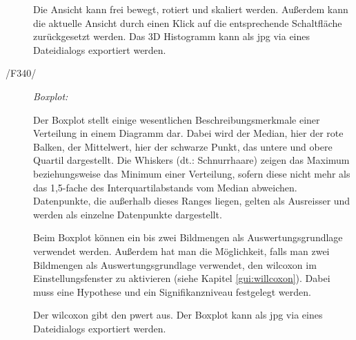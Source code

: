 \begin{description}
			Die Ansicht kann frei bewegt, rotiert und skaliert werden. Außerdem kann die aktuelle Ansicht durch einen Klick auf die entsprechende Schaltfläche zurückgesetzt werden. Das 3D Histogramm kann als \gls{jpg} via eines Dateidialogs exportiert werden.
\newpage
		\item[/F340/] \textit{Boxplot:}\par 
			\begin{figure}[H]
				\centering
			\end{figure}
			Der Boxplot stellt einige wesentlichen Beschreibungsmerkmale einer Verteilung in einem Diagramm dar. Dabei wird der Median, hier der rote Balken, der Mittelwert, hier der schwarze Punkt, das untere und obere Quartil dargestellt. Die Whiskers (dt.: Schnurrhaare) zeigen das Maximum beziehungsweise das Minimum einer Verteilung, sofern diese nicht mehr als das 1,5-fache des Interquartilabstands vom Median abweichen. Datenpunkte, die außerhalb dieses Ranges liegen, gelten als Ausreisser und werden als einzelne Datenpunkte dargestellt.
			\par
			Beim Boxplot können ein bis zwei Bildmengen als Auswertungsgrundlage verwendet werden. Außerdem hat man die Möglichkeit, falls man zwei Bildmengen als Auswertungsgrundlage verwendet, den \gls{wilcoxon} im Einstellungsfenster zu aktivieren (siehe Kapitel \ref{gui:willcoxon}). Dabei muss eine Hypothese und ein Signifikanzniveau festgelegt werden.
\par Der \gls{wilcoxon} gibt den \gls{pwert} aus. Der Boxplot kann als \gls{jpg} via eines Dateidialogs exportiert werden.


\end{description}
